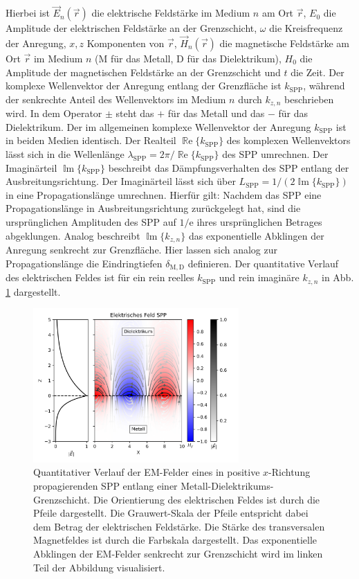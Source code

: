 \documentclass[titlepage,  ngerman]{article}
\renewcommand{\Re}{\operatorname{\mathbb{R}e}}
\renewcommand{\Im}{\operatorname{\mathbb{I}m}}
\begin{document}
	Hierbei ist $\vec{E}_n(\vec{r})$ die elektrische Feldstärke im Medium $n$ am Ort $\vec{r}$, $E_0$ die Amplitude der elektrischen Feldstärke an der Grenzschicht, $\omega$ die Kreisfrequenz der Anregung, $x, z$ Komponenten von $\vec{r}$, $\vec{H}_n(\vec{r})$ die magnetische Feldstärke am Ort $\vec{r}$ im Medium $n$ ($\mathrm{M}$ für das Metall, $\mathrm{D}$ für das Dielektrikum), $H_0$ die Amplitude der magnetischen Feldstärke an der Grenzschicht und $t$ die Zeit. Der komplexe Wellenvektor der Anregung entlang der Grenzfläche ist $k_{\mathrm{SPP}}$, während der senkrechte Anteil des Wellenvektors im Medium $n$ durch $k_{z,n}$ beschrieben wird.
	In dem Operator $\pm$ steht das $+$ für das Metall und das $-$ für das Dielektrikum. Der im allgemeinen komplexe Wellenvektor der Anregung $k_{\mathrm{SPP}}$ ist in beiden Medien identisch. Der Realteil $\Re\{k_{\mathrm{SPP}}\}$ des komplexen Wellenvektors lässt sich in die Wellenlänge $\lambda_{\mathrm{SPP}} = 2\pi/ \Re\{k_{\mathrm{SPP}}\} $ des SPP umrechnen. Der Imaginärteil $\Im\{k_{\mathrm{SPP}}\}$ beschreibt das Dämpfungsverhalten des SPP entlang der Ausbreitungsrichtung. Der Imaginärteil lässt sich über $L_{\mathrm{SPP}} = 1/(2\Im\{k_{\mathrm{SPP}}\})$ in eine Propagationslänge umrechnen.  Hierfür gilt: Nachdem das SPP eine Propagationslänge in Ausbreitungsrichtung zurückgelegt hat, sind die ursprünglichen Amplituden des SPP auf $1/\mathrm{e}$ ihres ursprünglichen Betrages abgeklungen. Analog beschreibt $\Im\{k_{z, n}\}$ das exponentielle Abklingen der Anregung senkrecht zur Grenzfläche. Hier lassen sich analog zur Propagationslänge die Eindringtiefen $\delta_{\mathrm{M,D}}$ definieren. Der quantitative Verlauf des elektrischen Feldes ist für ein rein reelles $k_{\mathrm{SPP}}$ und rein imaginäre $k_{z, n}$ in Abb. \ref{fig:electric_field_spp} dargestellt. 
	\begin{figure}[h] 
		\centering
		\includegraphics[width=0.7\textwidth]{figures/E_Feld_SPP.png}
		\caption[Feldorientierung SPP]{Quantitativer Verlauf der EM-Felder eines in positive $x$-Richtung propagierenden SPP entlang einer Metall-Dielektrikums-Grenzschicht. Die Orientierung des elektrischen Feldes ist durch die Pfeile dargestellt. Die Grauwert-Skala der Pfeile entspricht dabei dem Betrag der elektrischen Feldstärke. Die Stärke des transversalen Magnetfeldes ist durch die Farbskala dargestellt. Das exponentielle Abklingen der EM-Felder senkrecht zur Grenzschicht wird im linken Teil der Abbildung visualisiert.}
		\label{fig:electric_field_spp}
	\end{figure}
	
\end{document}
